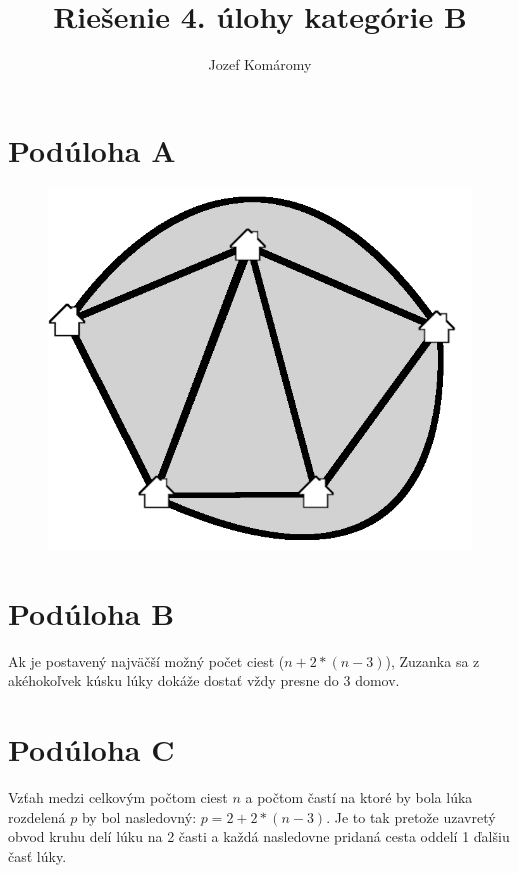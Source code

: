 \documentclass{article}
\begin{document}
\title{Riešenie 4. úlohy kategórie B}
\author{Jozef Komáromy}

\maketitle

\section{Podúloha A}

\begin{figure}[h]
  \centering
\includegraphics{A}
\end{figure}

\section{Podúloha B}

Ak je postavený najväčší možný počet ciest (\(n + 2 * (n - 3)\)), Zuzanka sa z akéhokoľvek kúsku lúky dokáže dostať vždy presne do 3 domov.

\section{Podúloha C}

Vzťah medzi celkovým počtom ciest \(n\) a počtom častí na ktoré by bola lúka rozdelená \(p\) by bol nasledovný: \(p = 2 + 2 * (n - 3)\). Je to tak pretože uzavretý obvod kruhu delí lúku na 2 časti a každá nasledovne pridaná cesta oddelí 1 ďalšiu časť lúky.
\end{document}
